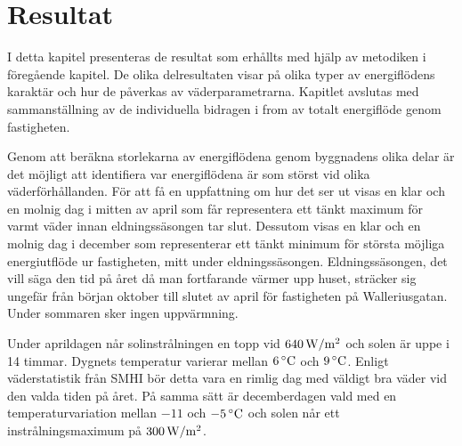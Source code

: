 \chapter{Resultat}

I detta kapitel presenteras de resultat som erhållts med hjälp av metodiken i föregående kapitel. De olika delresultaten visar på olika typer av energiflödens karaktär och hur de påverkas av väderparametrarna. Kapitlet avslutas med sammanställning av de individuella bidragen i from av totalt energiflöde genom fastigheten.

Genom att beräkna storlekarna av energiflödena genom byggnadens olika delar är det möjligt att identifiera var energiflödena är som störst vid olika väderförhållanden. För att få en uppfattning om hur det ser ut visas en klar och en molnig dag i mitten av april som får representera ett tänkt maximum för varmt väder innan eldningssäsongen tar slut. Dessutom visas en klar och en molnig dag i december som representerar ett tänkt minimum för största möjliga energiutflöde ur fastigheten, mitt under eldningssäsongen. Eldningssäsongen, det vill säga den tid på året då man fortfarande värmer upp huset, sträcker sig ungefär från början oktober till slutet av april för fastigheten på Walleriusgatan. Under sommaren sker ingen uppvärmning.

Under aprildagen når solinstrålningen en topp vid $\unit[640]{W/m^2}$ och solen är uppe i 14 timmar. Dygnets temperatur varierar mellan $\unit[6]{^\circ C}$ och $\unit[9]{^\circ C}$. Enligt väderstatistik från SMHI\cite{SMHIdata} bör detta vara en rimlig dag med väldigt bra väder vid den valda tiden på året. På samma sätt är decemberdagen vald med en temperaturvariation mellan $-11$ och $\unit[-5]{^\circ C}$ och solen når ett instrålningsmaximum på $\unit[300]{W/m^2}$.









% 


